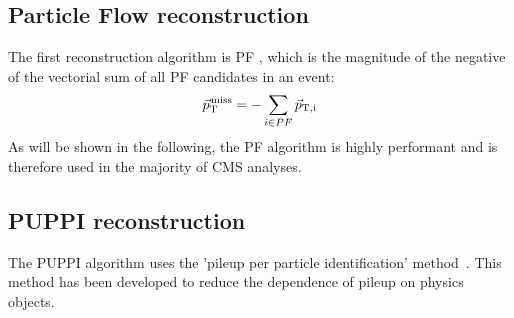 \subsection*{Particle Flow \ptmiss reconstruction}
\noindent
\justify
The first reconstruction algorithm is PF \ptmiss, which is the magnitude of the negative of the vectorial sum of all PF candidates in an event:
\begin{equation}
{\vec p}_{\mathrm{T}}^{\kern1pt\text{miss}} =- \sum_{i\in PF} \vec{p}_{\mathrm{T, i}}
\label{eq:MET}
\end{equation}                                                                      
As will be shown in the following, the PF \ptmiss algorithm is highly performant and is therefore used in the majority of CMS analyses.
\subsection*{PUPPI \ptmiss reconstruction}
\noindent
\justify
The PUPPI \ptmiss algorithm uses the 'pileup per particle identification' method~\cite{Bertolini:2014bba}. This method has been developed to reduce the dependence of pileup on physics objects. 
